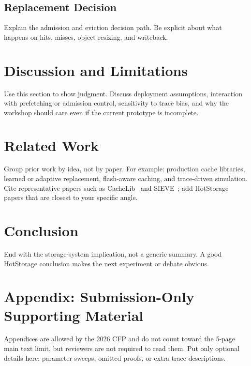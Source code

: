 \documentclass[sigconf,10pt,anonymous,review]{acmart}
\begin{document}
\subsection{Replacement Decision}
Explain the admission and eviction decision path. Be explicit about what happens
on hits, misses, object resizing, and writeback.



\section{Discussion and Limitations}
\label{sec:discussion}

Use this section to show judgment. Discuss deployment assumptions, interaction
with prefetching or admission control, sensitivity to trace bias, and why the
workshop should care even if the current prototype is incomplete.

\section{Related Work}
\label{sec:related}

Group prior work by idea, not by paper. For example: production cache
libraries, learned or adaptive replacement, flash-aware caching, and trace-driven
simulation. Cite representative papers such as CacheLib~\cite{berg2020cachelib}
and SIEVE~\cite{yang2024sieve}; add HotStorage papers that are closest to your
specific angle.

\section{Conclusion}
\label{sec:conclusion}

End with the storage-system implication, not a generic summary. A good
HotStorage conclusion makes the next experiment or debate obvious.

\clearpage



\appendix
\section{Appendix: Submission-Only Supporting Material}
Appendices are allowed by the 2026 CFP and do not count toward the 5-page main
text limit, but reviewers are not required to read them. Put only optional
details here: parameter sweeps, omitted proofs, or extra trace descriptions.
\end{document}
